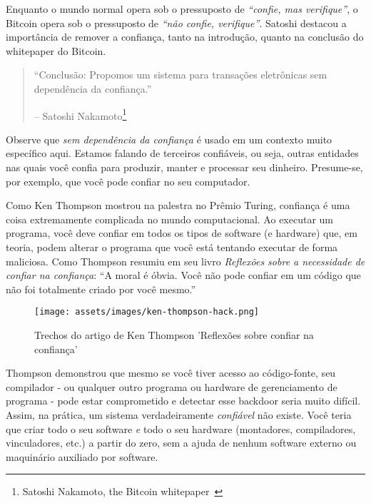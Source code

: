 Enquanto o mundo normal opera sob o pressuposto de \textit{\enquote {confie, mas verifique}}, o Bitcoin opera sob o pressuposto de \textit{\enquote{não confie, verifique}}. Satoshi destacou a importância de remover a confiança, tanto na introdução, quanto na conclusão do whitepaper do Bitcoin.

\begin{quotation}\begin{samepage}
\enquote{Conclusão: Propomos um sistema para transações eletrônicas sem dependência da confiança.}
\begin{flushright} -- Satoshi Nakamoto\footnote{Satoshi Nakamoto, the Bitcoin whitepaper~\cite{whitepaper}}
\end{flushright}\end{samepage}\end{quotation}

Observe que \textit{sem dependência da confiança} é usado em um contexto muito específico aqui. Estamos falando de terceiros confiáveis, ou seja, outras entidades nas quais você confia para produzir, manter e processar seu dinheiro. Presume-se, por exemplo, que você pode confiar no seu computador.

Como Ken Thompson mostrou na palestra no Prêmio Turing, confiança é uma coisa extremamente complicada no mundo computacional. Ao executar um programa, você deve confiar em todos os tipos de software (e hardware) que, em teoria, podem alterar o programa que você está tentando executar de forma maliciosa. Como Thompson resumiu em seu livro \textit{Reflexões sobre a necessidade de confiar na confiança}: \enquote{A moral é óbvia. Você não pode confiar em um código que não foi totalmente criado por você mesmo.}~\cite{trusting-trust}

\begin{figure}
  \texttt{[image: assets/images/ken-thompson-hack.png]}
  \caption{Trechos do artigo de Ken Thompson 'Reflexões sobre confiar na confiança'}
  \label{fig:ken-thompson-hack}
\end{figure}

Thompson demonstrou que mesmo se você tiver acesso ao código-fonte, seu compilador - ou qualquer outro programa ou hardware de gerenciamento de programa - pode estar comprometido e detectar esse backdoor seria muito difícil. Assim, na prática, um sistema verdadeiramente \textit{confiável} não existe. Você teria que criar todo o seu software \textit{e} todo o seu hardware (montadores, compiladores, vinculadores, etc.) a partir do zero, sem a ajuda de nenhum software externo ou maquinário auxiliado por software.

